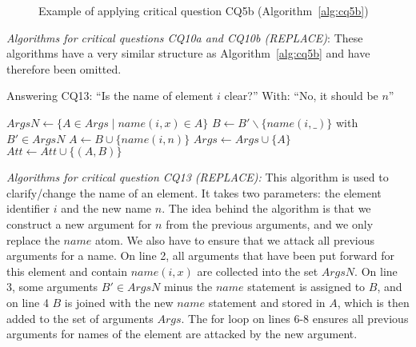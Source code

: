 \begin{figure*}[ht!]
\centering
\caption{Example of applying critical question CQ5b (Algorithm~\ref{alg:cq5b})}
\label{fig:examples:cq5b}
\end{figure*}

\emph{Algorithms for critical questions CQ10a and CQ10b (REPLACE)}: These algorithms have a very similar structure as Algorithm~\ref{alg:cq5b} and have therefore been omitted.

\begin{algorithm}[h]
  \caption{Answering CQ13: ``Is the name of element $i$ clear?'' With: ``No, it should be $n$''}\label{alg:cq13}
  \begin{algorithmic}[1]
    \State $ArgsN \gets\{ A\in Args \mid name(i,x)\in A\}$
    \State $B\gets B'\backslash \{name(i,\_)\}$ with $B'\in ArgsN$
    \State $A \gets B \cup \{name(i,n)\}$
    \State $Args \gets Args \cup \{A\}$
      \State $Att\gets Att \cup \{(A,B)\}$
    \EndFor
    \EndProcedure
  \end{algorithmic}
\end{algorithm}

\emph{Algorithms for critical question CQ13 (REPLACE):} This algorithm is used to clarify/change the name of an element. It takes two parameters: the element identifier $i$ and the new name $n$. The idea behind the algorithm is that we construct a new argument for $n$ from the previous arguments, and we only replace the $name$ atom. We also have to ensure that we attack all previous arguments for a name. On line 2, all arguments that have been put forward for this element and contain $name(i,x)$ are collected into the set $ArgsN$. On line 3, some arguments $B'\in ArgsN$ minus the $name$ statement is assigned to $B$, and on line 4 $B$ is joined with the new $name$ statement and stored in $A$, which is then added to the set of arguments $Args$. The for loop on lines 6-8 ensures all previous arguments for names of the element are attacked by the new argument.

